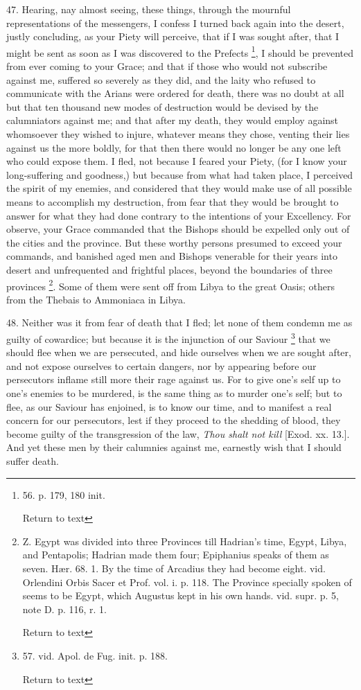 47. Hearing, nay almost seeing, these things, through the mournful
representations of the messengers, I confess I turned back again into
the desert, justly concluding, as your Piety will perceive, that if I
was sought after, that I might be sent as soon as I was discovered to
the Prefects \footnote{56. p. 179, 180 init.

Return to text}, I
should be prevented from ever coming to your Grace; and that if those who would not subscribe against me, suffered so severely as they
did, and the laity who refused to communicate with the Arians were
ordered for death, there was no doubt at all but that ten thousand new
modes of destruction would be devised by the calumniators against me;
and that after my death, they would employ against whomsoever they
wished to injure, whatever means they chose, venting their lies
against us the more boldly, for that then there would no longer be any
one left who could expose them. I fled, not because I feared your
Piety, (for I know your long-suffering and goodness,) but because from
what had taken place, I perceived the spirit of my enemies, and
considered that they would make use of all possible means to
accomplish my destruction, from fear that they would be brought to
answer for what they had done contrary to the intentions of your
Excellency. For observe, your Grace commanded that the Bishops should
be expelled only out of the cities and the province. But these worthy
persons presumed to exceed your commands, and banished aged men and
Bishops venerable for their years into desert and unfrequented and
frightful places, beyond the boundaries of three provinces \footnote{Z. Egypt was divided into three Provinces till Hadrian's time, Egypt,
Libya, and Pentapolis; Hadrian made them four; Epiphanius speaks of
them as seven. Hær. 68. 1. By the time of Arcadius they had become
eight. vid. Orlendini Orbis Sacer et Prof. vol. i. p. 118. The
Province specially spoken of seems to be Egypt, which Augustus kept in
his own hands. vid. supr. p. 5, note D. p. 116, r. 1.

Return to text

}. Some of them were sent off from Libya to the great Oasis;
others from the Thebais to Ammoniaca in Libya.

48. Neither was it from fear of death that I fled; let none of them
condemn me as guilty of cowardice; but because it is the injunction of
our Saviour \footnote{57. vid. Apol. de Fug. init. p. 188.

Return to text} that we
should flee when we are persecuted, and hide ourselves when we are
sought after, and not expose ourselves to certain dangers, nor by
appearing before our persecutors inflame still more their rage against
us. For to give one's self up to one's enemies to be murdered, is the
same thing as to murder one's self; but to flee, as our Saviour has
enjoined, is to know our time, and to manifest a real concern for our
persecutors, lest if they proceed to the shedding of blood, they
become guilty of the transgression of the law, \emph{Thou
shalt not kill}
[Exod. xx. 13.]. And yet these men by their calumnies against
me, earnestly wish that I should suffer death.

